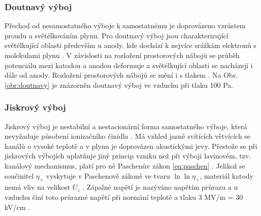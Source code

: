 \subsubsection{Doutnavý výboj}
\par Přechod od nesamostatného výboje k samostatnému je doprovázeno vzrůstem proudu a světélkováním plynu. Pro doutnavý výboj jsou charakterizující světélkující oblasti především u anody, kde dochází k nejvíce srážkám elektronů s molekulami plynu \cite{kracik}. V závislosti na rozložení prostorových nábojů se průběh potenciálu mezi katodou a anodou deformuje a světélkující oblasti se nacházejí i dále od anody. Rozložení prostorových nábojů se mění i s tlakem \cite{edu-techmania}. Na Obr. \ref{obr:doutnavy} je znázorněn doutnavý výboj ve vzduchu při tlaku 100 Pa.

\subsubsection{Jiskrový výboj}
\par Jiskrový výboj je nestabilní a nestacionární forma samostatného výboje, která nevyžaduje působení ionizačního činidla \cite{kracik}. Má vzhled jasně svítících větvících se kanálů o vysoké teplotě a v plynu je doprovázen akustickými jevy. Přestože se při jiskrových výbojích uplatňuje jiný princip vzniku než při výboji lavinovém, tzv. kanálový mechanismus, platí pro ně Paschenův zákon \eqref{eq:paschen} \cite{kracik}. Jelikož se součinitel $\eta_+$ vyskytuje v Paschenově zákoně ve tvaru $\ln \ln \eta_+$, materiál katody nemá vliv na velikost $U_z$ \cite{kracik}. Zápalné napětí je nazýváno napětím průrazu a u vzduchu činí toto průrazné napětí při normání teplotě a tlaku 3 MV/m = 30 kV/cm \cite{tipler1987}.




